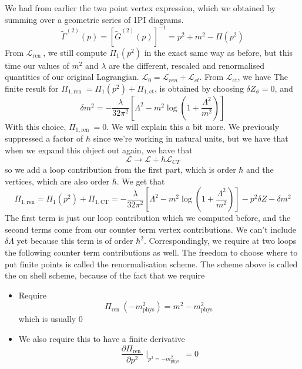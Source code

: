 \documentclass[11pt, oneside]{article}   	%
\theoremstyle{slanted}
\begin{document}
We had from earlier the two point vertex 
expression, which we obtained 
by summing over a geometric series of 1PI diagrams. 
\[
\tilde{ \Gamma } ^{ \left( 2  \right)  } \left( p  \right)   = 
\left[ \tilde{ G } ^{ \left( 2  \right)  } \left( p  \right)    \right]  ^{ - 1 } 
 = p ^ 2 + m ^ 2  - \Pi \left( p ^ 2  \right) 
\] From $ \mathcal{ L  } _{\text{ren } } $, we 
still compute
$ \Pi _ 1 \left( p ^ 2  \right)  $ in the exact same 
way as before, but this time our values of 
$ m ^ 2 $ and $ \lambda $ are the different, rescaled and renormalised quantities of our 
original Lagrangian. 
$ \mathcal{ L } _ 0  = \mathcal{ L } _{ ren } + \mathcal{ L  } _{ ct } $. 
From $ \mathcal{ L } _{\text{ct} } $, we have 
The finite result for 
$ \Pi _{ 1 , \text{ren } }  = \Pi _{1 } \left( p ^ 2  \right)  + \Pi _{1,  \text{ct}}$, 
is obtained by choosing $ \delta Z _ \phi  = 0$, and 
\[
\delta m ^ 2  =  - \frac{\lambda }{32 \pi ^ 2 }\left[  \Lambda ^ 2 
- m ^ 2 \log \left( 1 + \frac{\Lambda ^ 2 }{ m ^ 2 }  \right)  \right] 
\]  With this choice, $ \Pi _{ 1, \text{ren }} = 0 $.
We will explain this a bit more. We previously suppressed 
a factor of $ \hbar$ since we're working in 
natural units, but we have that when we expand this object out again, 
we have that 
\[
\mathcal{ L }  \to \mathcal{ L } + \hbar \mathcal{ L } _{CT}
\] so we add a loop contribution 
from the first part, which is order $ \hbar $ and 
the vertices, which are also order $ \hbar $.
We get that 
\[
\Pi_{1, \text{ren}} = \Pi_ 1\left( p ^ 2   \right) + 
\Pi_{ 1, \text{CT}} = 
 - \frac{\lambda }{ 32 \pi ^ 2 } \left[  
 \Lambda ^ 2  - m ^ 2 \log \left( 1 + 
\frac{\Lambda ^ 2 }{ m ^ 2 }\right) \right] - p ^ 2 \delta Z  - \delta m ^ 2 
\] The first term is just our loop contribution which 
we computed before, and the second terms come from 
our counter term vertex contributions.
We can't include $ \delta \Lambda $ yet because 
this term is of order $ \hbar ^ 2 $. 
Correspondingly, we require at two loops 
the following counter term contributions as well. 
The freedom to choose where to put 
finite points is called the renormalisation 
scheme. The scheme above is called 
the on shell scheme, 
because of the fact that we require 
\begin{itemize}
\item  Require 
	\[
		\Pi _{\text{ren } } \left(  - m ^ 2 _{ \text{phys} } \right) 
		 = m ^ 2  - m ^ 2_{\text{phys } } 
	\] which is usually 0 
\item We also require this to have a 
	finite derivative 
	\[
	 \frac{\partial  \Pi _{ \text{ren } } }{\partial  p ^ 2 }  \mid_{ p ^ 2 
	  = - m ^ 2 _{ \text{phys } } }  =0 
	\] 
\end{itemize}
\end{document}
